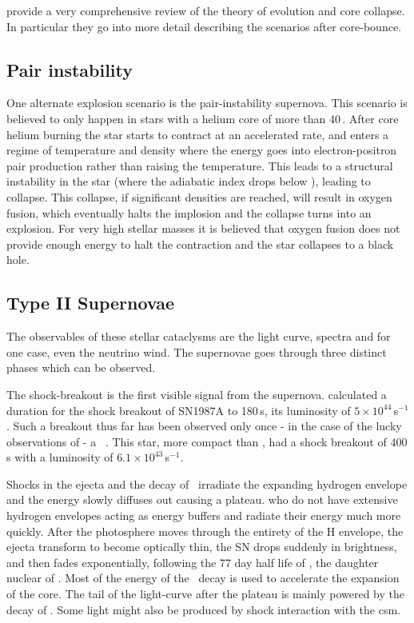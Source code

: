  \citet{2002RvMP...74.1015W} provide a very comprehensive review of the theory of evolution and core collapse. In particular they go into more detail describing the scenarios after core-bounce.

\subsection{Pair instability}
One alternate explosion scenario is the pair-instability supernova. This scenario is believed to only happen in stars with a helium core of more than 40\,\msun. After core helium burning the star starts to contract at an accelerated rate, and enters a regime of temperature and density where the energy goes into electron-positron pair production rather than raising the temperature. This leads to a structural instability in the star (where the adiabatic index drops below ), leading to collapse. This collapse, if significant densities are reached, will result in oxygen fusion, which eventually halts the implosion and the collapse turns into an explosion. For very high stellar masses it is believed that oxygen fusion does not provide enough energy to halt the contraction and the star collapses to a black hole.


\subsection{Type II Supernovae}
The observables of these stellar cataclysms are the light curve, spectra and for one case, even the neutrino wind. The supernovae goes through three distinct phases which can be observed. 

The shock-breakout is the first visible signal from the supernova.  \cite{1992ApJ...393..742E} calculated a duration for the  shock breakout of SN1987A to 180\,s, its  luminosity of $5\times10^{44}$\erg\,s$^{-1}$. 
Such a breakout thus far has been observed only once - in the case of the lucky observations of  - a \snibc\ \citep{2008Natur.453..469S}. This star, more compact than , had a shock breakout of 400\,s with a luminosity of $6.1\times10^{43}$\erg\,s$^{-1}$.

Shocks in the ejecta and the decay of \Ni\ irradiate the expanding hydrogen envelope and the energy slowly diffuses out causing a plateau. \sniil who do not have extensive hydrogen envelopes acting as energy buffers and radiate their energy much more quickly. After the photosphere moves through the entirety of the H envelope, the ejecta transform to become optically thin, the SN drops suddenly in brightness, and then fades exponentially, following the 77 day half life of , the daughter nuclear of \Ni. Most of the energy of the \Ni\ decay is used to accelerate the expansion of the core. The tail of the light-curve after the plateau is mainly powered by the decay of \Co. Some light might also be produced by shock interaction with the \gls{csm}.





